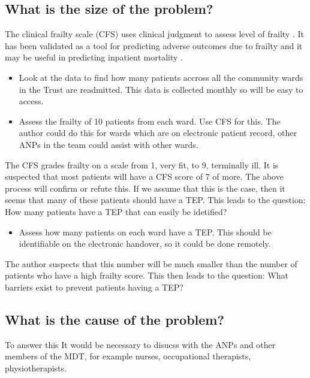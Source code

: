 \documentclass[12pt,a4paper,oneside,titlepage]{article}
\begin{document}
\subsection*{What is the size of the problem?}
The clinical frailty scale (CFS) uses clinical judgment to assess level of frailty
\parencite{dalhousie:15}. It has been validated as a tool for predicting adverse
outcomes due to frailty \parencite{rockwood:05} and it may be useful in predicting
inpatient mortality \parencite{wallis:15}.

\begin{itemize}
\item Look at the data to find how many patients accross all the community wards in the
    Trust are readmitted. This data is collected monthly so will be easy to access.
\item Assess the frailty of 10 patients from each ward. Use CFS for this.
	The author could do this for wards which are on electronic patient record, other ANPs
	in the team could assist with other wards.
\end{itemize}

The CFS grades frailty on a scale from 1, very fit, to 9, terminally ill.
It is suspected that most patients will have a CFS score of 7 of more. The above process 
will confirm or refute this. If we assume that this is the case, then it seems
that many of these patients should have a TEP. This leads to the question: 
How many patients have a TEP that can easily be idetified?

\begin{itemize}

\item Assess how many patients on each ward have a TEP. This should be identifiable on 
	the electronic handover, so it could be done remotely.
\end{itemize}

The author suspects that this number will be much smaller than the number of patients 
who have a high frailty score. This then leads to the question: 
What barriers exist to prevent patients having a TEP?

\subsection*{What is the cause of the problem?}
To answer this It would be necessary to disucss with the ANPs and other members of
the MDT, for example nurses, occupational therapists, physiotherapists.
\end{document}

